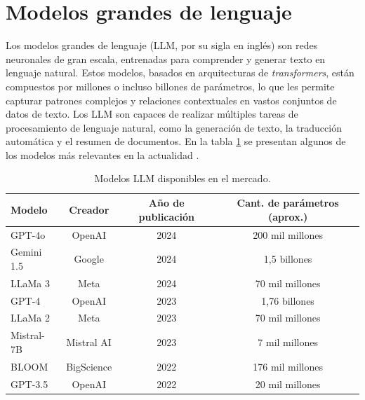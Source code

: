\section{Modelos grandes de lenguaje}

Los modelos grandes de lenguaje (LLM, por su sigla en inglés) son redes neuronales de gran escala, entrenadas 
para comprender y generar texto en lenguaje natural. Estos modelos, basados en arquitecturas de \textit{transformers}, 
están compuestos por millones o incluso billones de parámetros, lo que les permite capturar patrones complejos y 
relaciones contextuales en vastos conjuntos de datos de texto. Los LLM son capaces de realizar múltiples 
tareas de procesamiento de lenguaje natural, como la generación de texto, la traducción 
automática y el resumen de documentos. En la tabla \ref{tab:llms} se presentan 
algunos de los modelos más relevantes en la actualidad \citep{website:lifearchitect}.

\vspace{5mm}

\begin{table}[h]
	\centering
	\caption[Modelos LLM disponibles en el mercado]{Modelos LLM disponibles en el mercado.}
	\begin{tabular}{l c c c}    
		\toprule
		\textbf{Modelo} 	 & \textbf{Creador} 	& \textbf{Año de publicación}  & \textbf{Cant. de parámetros (aprox.)}\\
		\midrule
		GPT-4o               & OpenAI 				& 2024                         & 200 mil millones\\		
		Gemini 1.5      	 & Google				& 2024                         & 1,5 billones\\
		LLaMa 3         	 & Meta				    & 2024                         & 70 mil millones\\
        GPT-4         	     & OpenAI				& 2023                         & 1,76 billones\\
        LLaMa 2         	 & Meta				    & 2023                         & 70 mil millones\\
        Mistral-7B         	 & Mistral AI		    & 2023                         & 7 mil millones\\
        BLOOM         	     & BigScience		    & 2022                         & 176 mil millones\\
        GPT-3.5         	 & OpenAI				& 2022                         & 20 mil millones\\
		\bottomrule
		\hline
	\end{tabular}
	\label{tab:llms}
\end{table}

